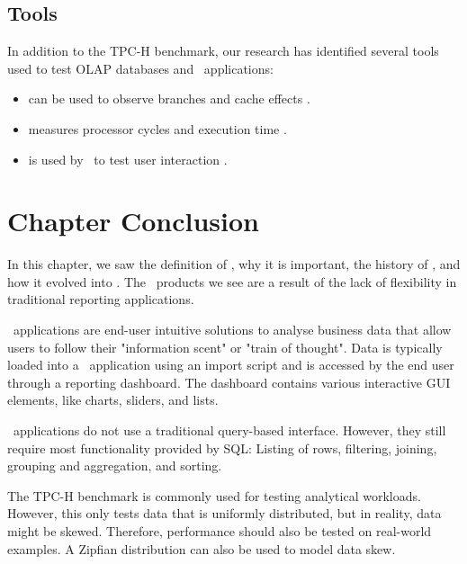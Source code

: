 \subsection{Tools}
\label{sub:Tools}
In addition to the TPC-H benchmark, our research has identified several tools used to test OLAP databases and \bd~applications:
\begin{itemize}
  \item {} can be used to observe branches and cache effects \cite{Neumann2011-uq}.
  \item {} measures processor cycles and execution time \cite{Willhalm2013-ri}.
  \item {} is used by \qlikview~to test user interaction \cite{Qlik2012-ku}.
\end{itemize}

\section{Chapter Conclusion}
\label{sec:Chapter Conclusion}
In this chapter, we saw the definition of \bi, why it is important, the history of \bi, and how it evolved into \bd. The \bd~products we see are a result of the lack of flexibility in traditional reporting applications.

\bd~applications are end-user intuitive solutions to analyse business data that allow users to follow their "information scent" or "train of thought". Data is typically loaded into a \bd~application using an import script and is accessed by the end user through a reporting dashboard. The dashboard contains various interactive GUI elements, like charts, sliders, and lists.

\bd~applications do not use a traditional query-based interface. However, they still require most functionality provided by SQL: Listing of rows, filtering, joining, grouping and aggregation, and sorting.

The TPC-H benchmark is commonly used for testing analytical workloads. However, this only tests data that is uniformly distributed, but in reality, data might be skewed. Therefore, performance should also be tested on real-world examples. A Zipfian distribution can also be used to model data skew.
